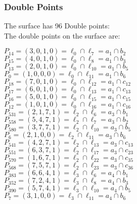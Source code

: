 \documentclass{article}
\begin{document}
{\subsubsection*{Double Points}
The surface has 96 Double points:\\
The double points on the surface are:\\
\begin{multicols}{2}
\noindent
$P_{14} = ( 3, 0, 1, 0 ) = \ell_{0} \cap \ell_{7}  = a_{1} \cap b_{2}$\\
$P_{15} = ( 4, 0, 1, 0 ) = \ell_{0} \cap \ell_{8}  = a_{1} \cap b_{3}$\\
$P_{13} = ( 2, 0, 1, 0 ) = \ell_{0} \cap \ell_{10}  = a_{1} \cap b_{5}$\\
$P_{0} = ( 1, 0, 0, 0 ) = \ell_{0} \cap \ell_{11}  = a_{1} \cap b_{6}$\\
$P_{18} = ( 7, 0, 1, 0 ) = \ell_{0} \cap \ell_{12}  = a_{1} \cap c_{12}$\\
$P_{17} = ( 6, 0, 1, 0 ) = \ell_{0} \cap \ell_{13}  = a_{1} \cap c_{13}$\\
$P_{16} = ( 5, 0, 1, 0 ) = \ell_{0} \cap \ell_{15}  = a_{1} \cap c_{15}$\\
$P_{12} = ( 1, 0, 1, 0 ) = \ell_{0} \cap \ell_{16}  = a_{1} \cap c_{16}$\\
$P_{531} = ( 2, 1, 7, 1 ) = \ell_{2} \cap \ell_{6}  = a_{3} \cap b_{1}$\\
$P_{558} = ( 5, 4, 7, 1 ) = \ell_{2} \cap \ell_{7}  = a_{3} \cap b_{2}$\\
$P_{580} = ( 3, 7, 7, 1 ) = \ell_{2} \cap \ell_{10}  = a_{3} \cap b_{5}$\\
$P_{6} = ( 2, 1, 0, 0 ) = \ell_{2} \cap \ell_{11}  = a_{3} \cap b_{6}$\\
$P_{541} = ( 4, 2, 7, 1 ) = \ell_{2} \cap \ell_{13}  = a_{3} \cap c_{13}$\\
$P_{551} = ( 6, 3, 7, 1 ) = \ell_{2} \cap \ell_{17}  = a_{3} \cap c_{23}$\\
$P_{570} = ( 1, 6, 7, 1 ) = \ell_{2} \cap \ell_{22}  = a_{3} \cap c_{35}$\\
$P_{568} = ( 7, 5, 7, 1 ) = \ell_{2} \cap \ell_{23}  = a_{3} \cap c_{36}$\\
$P_{383} = ( 6, 6, 4, 1 ) = \ell_{3} \cap \ell_{6}  = a_{4} \cap b_{1}$\\
$P_{352} = ( 7, 2, 4, 1 ) = \ell_{3} \cap \ell_{8}  = a_{4} \cap b_{3}$\\
$P_{390} = ( 5, 7, 4, 1 ) = \ell_{3} \cap \ell_{10}  = a_{4} \cap b_{5}$\\
$P_{7} = ( 3, 1, 0, 0 ) = \ell_{3} \cap \ell_{11}  = a_{4} \cap b_{6}$\\

\end{multicols}}
\end{document}
